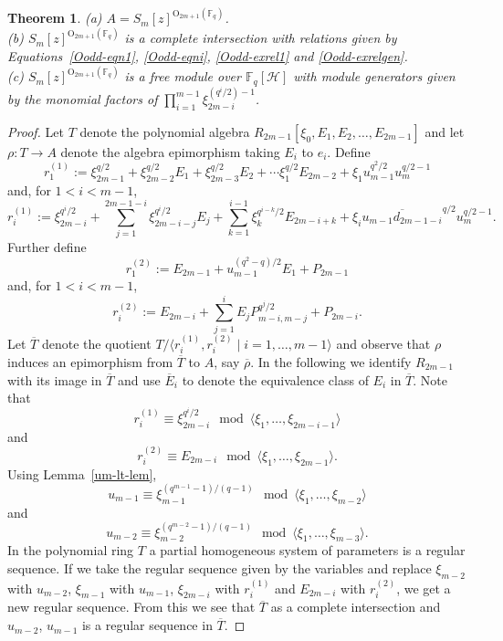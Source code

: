 \documentclass{amsart}
\newtheorem{theorem}[subsection]{Theorem}
\newcommand{\field}{\mathbb{F}}
\newcommand{\orth}[2]{{{\text{O}_{{#1}}(\field_{#2})}}}
\renewcommand{\H}{\mathcal{H}}
\begin{document}
\begin{theorem}\label{main_theorem} (a) $A=S_m[z]^{\orth{2m+1}{q}}$.\\
(b) $S_m[z]^{\orth{2m+1}{q}}$ is a complete intersection with relations given by 
Equations~\ref{Oodd-eqn1}, \ref{Oodd-eqni}, \ref{Oodd-exrel1} and \ref{Oodd-exrelgen}.\\
(c) $S_m[z]^{\orth{2m+1}{q}}$ is a free module over $\field_q[\H]$ with module generators given by the monomial factors of 
$\prod_{i=1}^{m-1} \xi_{2m-i}^{(q^i/2)-1}$.
\end{theorem}

\begin{proof} Let $T$ denote the polynomial algebra $R_{2m-1}[\xi_0,E_1,E_2,\ldots,E_{2m-1}]$ and let $\rho:T\to A$ denote the algebra epimorphism taking $E_i$ to $e_i$.  Define 
    $$
        r_1^{(1)}:=\xi_{2m-1}^{q/2}+\xi_{2m-2}^{q/2}E_1+\xi_{2m-3}^{q/2}E_2+\cdots \xi_{1}^{q/2}E_{2m-2}
        +\xi_1u_{m-1}^{q^2/2}u_m^{q/2-1}
    $$
and, for $1<i<m-1$,
    $$
        r_i^{(1)}:=\xi_{2m-i}^{q^i/2}+\sum_{j=1}^{2m-1-i} \xi_{2m-i-j}^{q^i/2} E_j +\sum_{k=1}^{i-1} \xi_k^{q^{i-k}/2} E_{2m-i+k}
        +\xi_i \overline{u_{m-1}d_{2m-1-i}}^{q/2} u_m^{q/2-1}.
    $$
Further define
    $$
        r_1^{(2)}:=E_{2m-1}+u_{m-1}^{(q^2-q)/2}E_1+P_{2m-1} 
    $$
and, for $1<i<m-1$,
    $$
        r_i^{(2)}:=E_{2m-i}+\sum_{j=1}^i E_jP_{m-i,m-j}^{q^j/2}+P_{2m-i}.
    $$
Let $\overline{T}$ denote the quotient $T/\langle r_i^{(1)},r_i^{(2)}\mid i=1,\dots,m-1\rangle$
and observe that $\rho$ induces an epimorphism  from $\overline{T}$ to $A$, say $\overline{\rho}$.
In the following we identify $R_{2m-1}$ with its image in $\overline{T}$ and use $\overline{E}_i$
to denote the equivalence class of $E_i$ in $\overline{T}$.
Note that $$r_i^{(1)}\equiv \xi_{2m-i}^{q^i/2}\mod \langle\xi_1,\ldots,\xi_{2m-i-1}\rangle$$
and $$r_i^{(2)}\equiv E_{2m-i}\mod \langle\xi_1,\ldots,\xi_{2m-1}\rangle.$$
Using Lemma~\ref{um-lt-lem}, 
$$u_{m-1}\equiv \xi_{m-1}^{(q^{m-1}-1)/(q-1)} \mod  \langle\xi_1,\ldots,\xi_{m-2}\rangle$$
and
$$u_{m-2}\equiv \xi_{m-2}^{(q^{m-2}-1)/(q-1)} \mod  \langle\xi_1,\ldots,\xi_{m-3}\rangle.$$
In the polynomial ring $T$ a partial homogeneous system of parameters is a regular sequence.
If we take the regular sequence given by the variables and replace $\xi_{m-2}$ with $u_{m-2}$,
$\xi_{m-1}$ with $u_{m-1}$, $\xi_{2m-i}$ with $r_i^{(1)}$ and $E_{2m-i}$ with $r_i^{(2)}$, we get a new regular sequence.
From this we see that $\overline{T}$ as a complete intersection and $u_{m-2}$, $u_{m-1}$ is a regular sequence in $\overline{T}$.


\end{proof}
\end{document}
